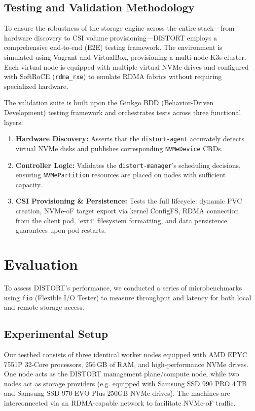 \documentclass[sigconf]{acmart}
\begin{document}
\subsection{Testing and Validation Methodology}
To ensure the robustness of the storage engine across the entire stack—from hardware discovery to CSI volume provisioning—DISTORT employs a comprehensive end-to-end (E2E) testing framework. The environment is simulated using Vagrant and VirtualBox, provisioning a multi-node K3s cluster. Each virtual node is equipped with multiple virtual NVMe drives and configured with SoftRoCE (\texttt{rdma\_rxe}) to emulate RDMA fabrics without requiring specialized hardware.

The validation suite is built upon the Ginkgo BDD (Behavior-Driven Development) testing framework and orchestrates tests across three functional layers:
\begin{enumerate}
    \item \textbf{Hardware Discovery:} Asserts that the \texttt{distort-agent} accurately detects virtual NVMe disks and publishes corresponding \texttt{NVMeDevice} CRDs.
    \item \textbf{Controller Logic:} Validates the \texttt{distort-manager}'s scheduling decisions, ensuring \texttt{NVMePartition} resources are placed on nodes with sufficient capacity.
    \item \textbf{CSI Provisioning \& Persistence:} Tests the full lifecycle: dynamic PVC creation, NVMe-oF target export via kernel ConfigFS, RDMA connection from the client pod, `ext4` filesystem formatting, and data persistence guarantees upon pod restarts.
\end{enumerate}

\section{Evaluation}
To assess DISTORT's performance, we conducted a series of microbenchmarks using \texttt{fio} (Flexible I/O Tester) to measure throughput and latency for both local and remote storage access.

\subsection{Experimental Setup}
Our testbed consists of three identical worker nodes equipped with AMD EPYC 7551P 32-Core processors, 256\,GB of RAM, and high-performance NVMe drives. One node acts as the DISTORT management plane/compute node, while two nodes act as storage providers (e.g. equipped with Samsung SSD 990 PRO 4\,TB and Samsung SSD 970 EVO Plus 250GB NVMe drives). The machines are interconnected via an RDMA-capable network to facilitate NVMe-oF traffic.
\end{document}
